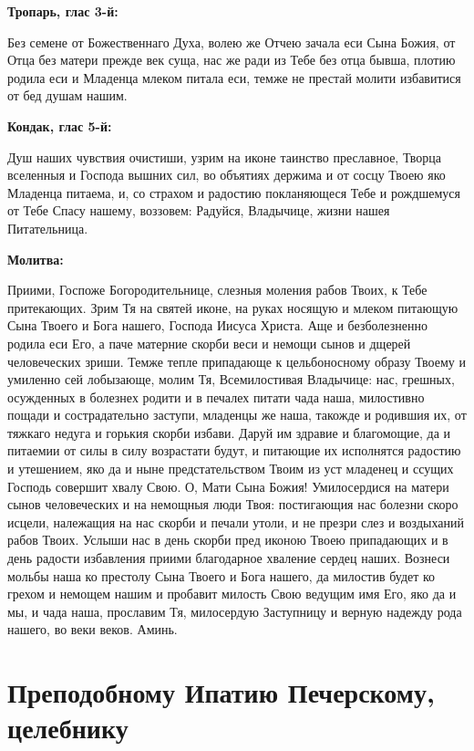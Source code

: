 \bfseries Тропарь, глас 3-й:\normalfont{}


Без семене от Божественнаго Духа, волею же Отчею зачала еси Сына Божия, от Отца без матери прежде век суща, нас же ради из Тебе без отца бывша, плотию родила еси и Младенца млеком питала еси, темже не престай молити избавитися от бед душам нашим.


\medskip
\bfseries Кондак, глас 5-й:\normalfont{}\nopagebreak


Душ наших чувствия очистиши, узрим на иконе таинство преславное, Творца вселенныя и Господа вышних сил, во объятиях держима и от сосцу Твоею яко Младенца питаема, и, со страхом и радостию покланяющеся Тебе и рождшемуся от Тебе Спасу нашему, воззовем: Радуйся, Владычице, жизни нашея Питательница.


\medskip
\bfseries Молитва:\normalfont{}\nopagebreak


Приими, Госпоже Богородительнице, слезныя моления рабов Твоих, к Тебе притекающих. Зрим Тя на святей иконе, на руках носящую и млеком питающую Сына Твоего и Бога нашего, Господа Иисуса Христа. Аще и безболезненно родила еси Его, а паче матерние скорби веси и немощи сынов и дщерей человеческих зриши. Темже тепле припадающе к цельбоносному образу Твоему и умиленно сей лобызающе, молим Тя, Всемилостивая Владычице: нас, грешных, осужденных в болезнех родити и в печалех питати чада наша, милостивно пощади и сострадательно заступи, младенцы же наша, такожде и родившия их, от тяжкаго недуга и горькия скорби избави. Даруй им здравие и благомощие, да и питаемии от силы в силу возрастати будут, и питающие их исполнятся радостию и утешением, яко да и ныне предстательством Твоим из уст младенец и ссущих Господь совершит хвалу Свою. О, Мати Сына Божия! Умилосердися на матери сынов человеческих и на немощныя люди Твоя: постигающия нас болезни скоро исцели, належащия на нас скорби и печали утоли, и не презри слез и воздыханий рабов Твоих. Услыши нас в день скорби пред иконою Твоею припадающих и в день радости избавления приими благодарное хваление сердец наших. Вознеси мольбы наша ко престолу Сына Твоего и Бога нашего, да милостив будет ко грехом и немощем нашим и пробавит милость Свою ведущим имя Его, яко да и мы, и чада наша, прославим Тя, милосердую Заступницу и верную надежду рода нашего, во веки веков. Аминь.

\section{Преподобному Ипатию Печерскому, целебнику}
 
